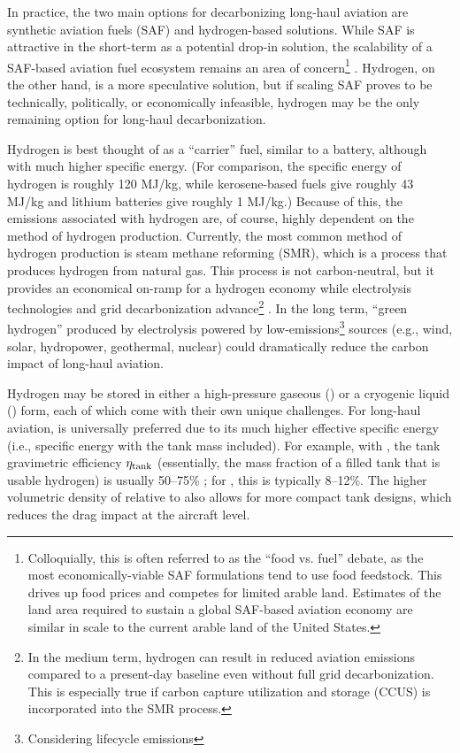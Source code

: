 In practice, the two main options for decarbonizing long-haul aviation are synthetic aviation fuels (SAF) and hydrogen-based solutions. While SAF is attractive in the short-term as a potential drop-in solution, the scalability of a SAF-based aviation fuel ecosystem remains an area of concern\footnote{Colloquially, this is often referred to as the ``food vs. fuel'' debate, as the most economically-viable SAF formulations tend to use food feedstock. This drives up food prices and competes for limited arable land. Estimates of the land area required to sustain a global SAF-based aviation economy are similar in scale to the current arable land of the United States.} \cite{waypoint2050, gaubatz_estimating_2023}. Hydrogen, on the other hand, is a more speculative solution, but if scaling SAF proves to be technically, politically, or economically infeasible, hydrogen may be the only remaining option for long-haul decarbonization.

Hydrogen is best thought of as a ``carrier'' fuel, similar to a battery, although with much higher specific energy. (For comparison, the specific energy of hydrogen is roughly 120 MJ/kg, while kerosene-based fuels give roughly 43 MJ/kg and lithium batteries give roughly 1 MJ/kg.) Because of this, the emissions associated with hydrogen are, of course, highly dependent on the method of hydrogen production. Currently, the most common method of hydrogen production is steam methane reforming (SMR), which is a process that produces hydrogen from natural gas. This process is not carbon-neutral, but it provides an economical on-ramp for a hydrogen economy while electrolysis technologies and grid decarbonization advance\footnote{In the medium term, hydrogen can result in reduced aviation emissions compared to a present-day baseline even without full grid decarbonization. This is especially true if carbon capture utilization and storage (CCUS) is incorporated into the SMR process.} \cite{cascade}. In the long term, ``green hydrogen'' produced by electrolysis powered by low-emissions\footnote{Considering lifecycle emissions} sources (e.g., wind, solar, hydropower, geothermal, nuclear) could dramatically reduce the carbon impact of long-haul aviation.

Hydrogen may be stored in either a high-pressure gaseous (\gh) or a cryogenic liquid (\lh) form, each of which come with their own unique challenges. For long-haul aviation, \lh is universally preferred due to its much higher effective specific energy (i.e., specific energy with the tank mass included). For example, with \lh, the tank gravimetric efficiency $\eta_{\rm tank}$ (essentially, the mass fraction of a filled tank that is usable hydrogen) is usually 50--75\% \cite{brewer_hydrogen_1991}; for \gh, this is typically 8--12\%. The higher volumetric density of \lh relative to \gh also allows for more compact tank designs, which reduces the drag impact at the aircraft level.

